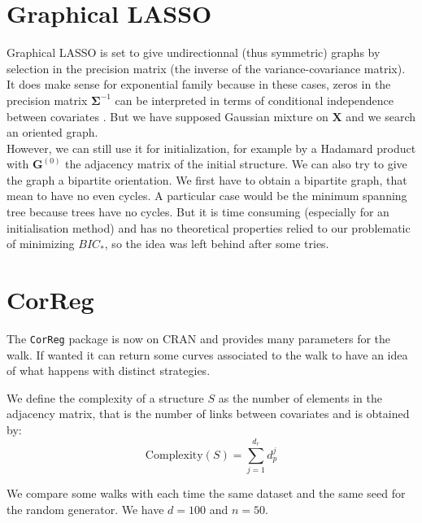 \documentclass[12pt,a4paper]{report}
\begin{document}
	\section{Graphical LASSO}\label{sectionGlasso}
		Graphical LASSO \cite{friedman2008sparse} \cite{witten2011new} \cite{tibshiranilasso} \cite{friedman2010applications} is set to give undirectionnal (thus symmetric) graphs by selection in the precision matrix (the inverse of the variance-covariance matrix). It does make sense for exponential family because in these cases, zeros in the precision matrix $\boldsymbol{\Sigma}^{-1}$ can be interpreted in terms of conditional independence between covariates \cite{dempster1972covariance}. But we have supposed Gaussian mixture on $\boldsymbol{X}$ and we search an oriented graph.\\
		
	However, we can still use it for initialization, for example by a Hadamard product with $\boldsymbol{G}^{(0)}$ the adjacency matrix of the initial structure. We can also try to give the graph a bipartite orientation. We first have to obtain a bipartite graph, that mean to have no even cycles. A particular case would be the minimum spanning tree \cite{graham1985history,moret1991empirical,gower1969minimum} because trees have no cycles. But it is time consuming (especially for an initialisation method) and has no theoretical properties relied to our problematic of minimizing $BIC_*$, so the idea was left behind after some tries.		
	
\section{CorReg}	
	The {\tt CorReg} package is now on CRAN and provides many parameters for the walk. If wanted it can return some curves associated to the walk to have an idea of what happens with distinct strategies. 		
	
We define the complexity of a structure $S$ as the number of elements in the adjacency matrix, that is the number of links between covariates and is obtained by:
\begin{equation}
	\textrm{Complexity}(S)=\sum_{j=1}^{d_r}d_p^j
\end{equation}	
	
		We compare some walks with each time the same dataset and the same seed for the random generator. We have $d=100$ and $n=50$.
		
\end{document}
